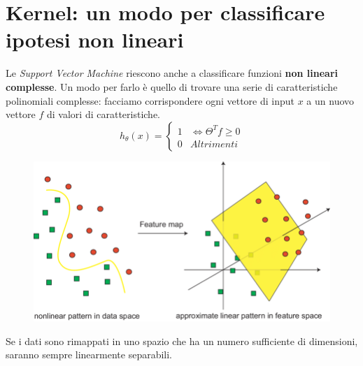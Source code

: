 \section{Kernel: un modo per classificare ipotesi non lineari}
Le \textit{Support Vector Machine} riescono anche a classificare funzioni \textbf{non lineari complesse}. Un modo per farlo è quello di trovare una serie di caratteristiche polinomiali complesse: facciamo corrispondere ogni vettore di input $x$ a un nuovo vettore $f$ di valori di caratteristiche.
  \[h_\theta(x) =
    \begin{cases}
      1& \iff \Theta^Tf \geq 0 \\
      0& Altrimenti
    \end{cases}
  \]
\begin{figure}[H]
    \centering
    \includegraphics[width=1\textwidth]{img/linear_nonLinear.png}
\end{figure}
\begin{definizione}
  Se i dati sono rimappati in uno spazio che ha un numero sufficiente di dimensioni, saranno sempre linearmente separabili.
\end{definizione}
